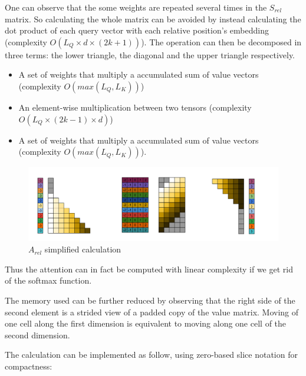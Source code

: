 One can observe that the some weights are repeated several times in the
\(S_{rel}\) matrix. So calculating the whole matrix can be avoided by
instead calculating the dot product of each query vector with each
relative position's embedding (complexity
\(O \left(L_Q\times d\times(2k+1)\right)\)). The operation can then be
decomposed in three terms: the lower triangle, the diagonal and the
upper triangle respectively.

\begin{itemize}
\item A set of weights that multiply a
accumulated sum of value vectors (complexity \(O(max(L_Q, L_K))\))
\item An
element-wise multiplication between two tensors (complexity
\(O(L_Q\times (2k-1) \times d)\))
\item A set of weights that multiply a
accumulated sum of value vectors (complexity \(O(max(L_Q, L_K))\)).
\end{itemize}

\begin{figure}
\centering
\includegraphics[width=0.9\linewidth]{images/S_rel_V_detailed.png}
\caption{$A_{rel}$ simplified calculation}
\end{figure}

Thus the attention can in fact be computed with linear complexity if we
get rid of the softmax function.

The memory used can be further reduced by observing that the right side
of the second element is a strided view of a padded copy of the value
matrix. Moving of one cell along the first dimension is equivalent to
moving along one cell of the second dimension.

The calculation can be implemented as follow, using zero-based slice
notation for compactness:


